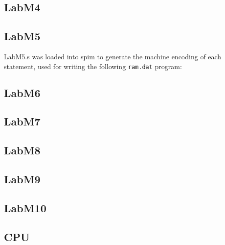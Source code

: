 \documentclass{article}
\begin{document}
\pagebreak

\subsection{LabM4}


\subsection{LabM5}


LabM5.s was loaded into spim to generate the machine encoding of each
statement, used for writing the following \verb$ram.dat$ program:
\pagebreak


\pagebreak

\subsection{LabM6}


\subsection{LabM7}


\subsection{LabM8}


\subsection{LabM9}


\subsection{LabM10}


\subsection{CPU}


\end{document}
